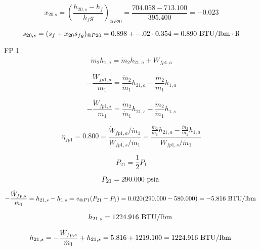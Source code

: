 \documentclass{article}
\begin{document}
\begin{equation}
x_{20.s} = (\frac{h_{20,s} - h_{f}}{h_fg})_{@P20} = \frac{ 704.058 -  713.100}{ 395.400} =   -0.023
\end{equation}

\begin{equation}
  s_{20,s} = (s_{f} + x_{20}s_{fg})_{@P20} =    0.898 + -.02\cdot   0.354 =    0.890
\textnormal{ BTU/lbm}\cdot\textnormal{R}
\end{equation}


FP 1
\begin{equation}
\dot{m}_{ 2}h_{ 1,a} = \dot{m}_{ 2}h_{21,a} + \dot{W}_{fp1,a}
\end{equation}

\begin{equation}
-\frac{\dot{W}_{fp1,a}}{m_1} = \frac{\dot{m}_{ 2}}{\dot{m}_{ 1}}h_{21,a} - \frac{\dot{m}_{ 2}}{\dot{m}_{ 1}}h_{ 1,a}\end{equation}

\begin{equation}
-\frac{\dot{W}_{fp1,s}}{m_1} = \frac{\dot{m}_{ 2}}{\dot{m}_{ 1}}h_{21,s} - \frac{\dot{m}_{ 2}}{\dot{m}_{ 1}}h_{ 1,s}\end{equation}

\begin{equation}
\eta_{fp1} =    0.800 = \frac{\dot{W}_{fp1,a} / \dot{m}_{1}}{\dot{W}_{fp1,s} / \dot{m}_{1}} = \frac{
\frac{\dot{m}_{ 2}}{\dot{m}_{ 1}}h_{21,a} - \frac{\dot{m}_{ 2}}{\dot{m}_{ 1}}h_{ 1,a}}{\dot{W}_{fp1,s} / \dot{m}_{1}}
\end{equation}

\begin{equation}
P_{21} = \frac{1}{2} P_{1}
\end{equation}

\begin{equation}
P_{21} =  290.000\textnormal{ psia                      }
\end{equation}

\begin{equation}
-\frac{\dot{W}_{fp,s}}{\dot{m}_{ 1}} = h_{21,s} - h_{1,s} = v_{@P1}(P_{21} - P_{1}) =    0.020( 290.000 -  580.000) =   -5.816\textnormal{ BTU/lbm                   }
\end{equation}

\begin{equation}
  h_{21,s} = 1224.916\textnormal{ BTU/lbm                   }
\end{equation}

\begin{equation}
h_{21,s} = -\frac{\dot{W}_{fp,s}}{\dot{m}_{1}} + h_{21,s} =    5.816 + 1219.100 = 1224.916\textnormal{ BTU/lbm                   }
\end{equation}
\end{document}
